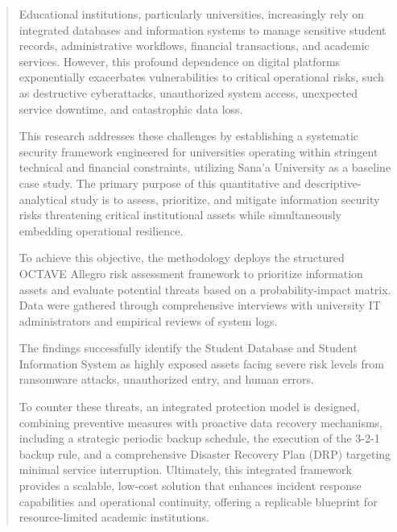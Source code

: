 \documentclass[journal,onecolumn,12pt,twoside]{IEEEtran}
\begin{document}
	\begin{abstract}
		Educational institutions, particularly universities, increasingly rely on integrated databases and information systems to manage sensitive student records, administrative workflows, financial transactions, and academic services. However, this profound dependence on digital platforms exponentially exacerbates vulnerabilities to critical operational risks, such as destructive cyberattacks, unauthorized system access, unexpected service downtime, and catastrophic data loss. 
		
		This research addresses these challenges by establishing a systematic security framework engineered for universities operating within stringent technical and financial constraints, utilizing Sana'a University as a baseline case study. The primary purpose of this quantitative and descriptive-analytical study is to assess, prioritize, and mitigate information security risks threatening critical institutional assets while simultaneously embedding operational resilience. 
		
		To achieve this objective, the methodology deploys the structured OCTAVE Allegro risk assessment framework to prioritize information assets and evaluate potential threats based on a probability-impact matrix. Data were gathered through comprehensive interviews with university IT administrators and empirical reviews of system logs. 
		
		The findings successfully identify the Student Database and Student Information System as highly exposed assets facing severe risk levels from ransomware attacks, unauthorized entry, and human errors. 
		
		To counter these threats, an integrated protection model is designed, combining preventive measures with proactive data recovery mechanisms, including a strategic periodic backup schedule, the execution of the 3-2-1 backup rule, and a comprehensive Disaster Recovery Plan (DRP) targeting minimal service interruption. Ultimately, this integrated framework provides a scalable, low-cost solution that enhances incident response capabilities and operational continuity, offering a replicable blueprint for resource-limited academic institutions.
	\end{abstract}
	
	\newpage
	\tableofcontents
	\listoftables
	\listoffigures
	
\end{document}
